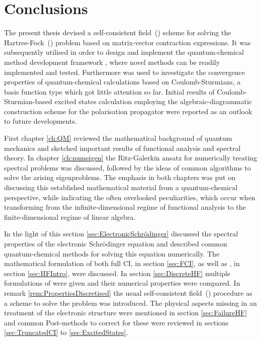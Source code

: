 \chapter{Conclusions}
\label{ch:Conclusion}

\noindent
The present thesis devised a self-consistent field~(\SCF)
scheme for solving the Hartree-Fock~(\HF) problem
based on matrix-vector contraction expressions.
It was subsequently utilised in order to design and implement the
quantum-chemical method development framework \molsturm,
where novel methods can be readily implemented and tested.
Furthermore \molsturm was used to investigate the convergence properties
of quantum-chemical calculations
based on Coulomb-Sturmians,
a basis function type which got little attention so far.
Initial results of Coulomb-Sturmian-based excited states
calculation employing the algebraic-diagrammatic construction scheme
for the polarisation propagator were reported
as an outlook to future developments.


First chapter \ref{ch:QM} reviewed the mathematical background of quantum mechanics
and sketched important results of functional analysis
and spectral theory.
In chapter \ref{ch:numeigen} the Ritz-Galerkin ansatz
for numerically treating spectral problems
was discussed, followed by the ideas of common algorithms
to solve the arising eigenproblems.
The emphasis in both chapters
was put on discussing this established mathematical
material from a quantum-chemical perspective,
while indicating the often overlooked peculiarities,
which occur when transforming from the infinite-dimensional regime
of functional analysis to the finite-dimensional regime of linear algebra.


In the light of this section \ref{sec:ElectronicSchrödinger}
discussed the spectral properties
of the electronic Schrödinger equation and
described common quantum-chemical methods
for solving this equation numerically.
The mathematical formulation of both full CI, in section \ref{sec:FCI},
as well as \HF, in section \ref{sec:HFIntro}, were discussed.
In section \ref{sec:DiscreteHF} multiple formulations of \HF were given
and their numerical properties were compared.
In remark \ref{rem:PropertiesDiscretised}
the usual self-consistent field~(\SCF) procedure
as a scheme to solve the \HF problem was introduced.
The physical aspects missing in an \HF treatment of the electronic
structure were mentioned in section \ref{sec:FailureHF}
and common Post-\HF methods to correct for these were
reviewed in sections \ref{sec:TruncatedCI} to \ref{sec:ExcitedStates}.

